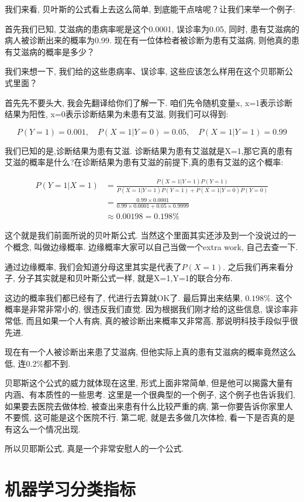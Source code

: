 我们来看, 贝叶斯的公式看上去这么简单, 到底能干点啥呢？让我们来举一个例子: 

首先我们已知, 艾滋病的患病率呢是这个0.0001, 误诊率为0.05, 同时, 患有艾滋病的病人被诊断出来的概率为0.99. 现在有一位体检者被诊断为患有艾滋病, 则他真的患有艾滋病的概率是多少？

我们来想一下, 我们给的这些患病率、误诊率, 这些应该怎么样用在这个贝耶斯公式里面？

首先先不要头大, 我会先翻译给你们了解一下. 咱们先令随机变量x, x=1表示诊断结果为阳性, x=0表示诊断结果为未患有艾滋, 则我们可以得到: 

\[ P(Y=1) = 0.001, \quad P(X=1|Y=0) = 0.05, \quad P(X=1|Y=1) = 0.99\]

我们已知的是,诊断结果为患有艾滋. 诊断结果为患有艾滋就是X=1,那它真的患有艾滋的概率是什么?在诊断结果为患有艾滋的前提下,真的患有艾滋的这个概率:

\begin{align*}
  P(Y=1|X=1) & = \frac{P(X=1|Y=1)P(Y=1)}{P(X=1|Y=1)P(Y=1)+P(X=1|Y=0)P(Y=0)} \\
  & = \frac{0.99 \times 0.0001}{0.99 \times 0.0001 + 0.05 \times 0.9999} \\
  & \approx 0.00198 = 0.198\%
\end{align*}

这个就是我们前面所说的贝叶斯公式. 当然这个里面其实还涉及到一个没说过的一个概念, 叫做边缘概率. 边缘概率大家可以自己当做一个extra work, 自己去查一下. 

通过边缘概率, 我们会知道分母这里其实是代表了$P(X=1)$. 之后我们再来看分子, 分子其实就是和贝叶斯公式一样, 就是X=1,Y=1的联合分布. 

这边的概率我们都已经有了, 代进行去算就OK了. 最后算出来结果, $0.198\%$. 这个概率是非常非常小的, 很违反我们直觉. 因为根据我们刚才给的这些信息, 误诊率非常低, 而且如果一个人有病, 真的被诊断出来概率又非常高, 那说明科技手段似乎很先进. 

现在有一个人被诊断出来患了艾滋病, 但他实际上真的患有艾滋病的概率竟然这么低, 连$0.2\%$都不到. 

贝耶斯这个公式的威力就体现在这里, 形式上面非常简单, 但是他可以揭露大量有内涵、有本质性的一些思考. 这里是一个很典型的一个例子, 这个例子也告诉我们, 如果要去医院去做体检, 被查出来患有什么比较严重的病, 第一你要告诉你家里人不要慌, 这可能是这个医院不行. 第二呢, 就是去多做几次体检, 看一下是否真的是有这么一个情况出现. 

所以贝耶斯公式, 真是一个非常安慰人的一个公式. 

\section{机器学习分类指标}

